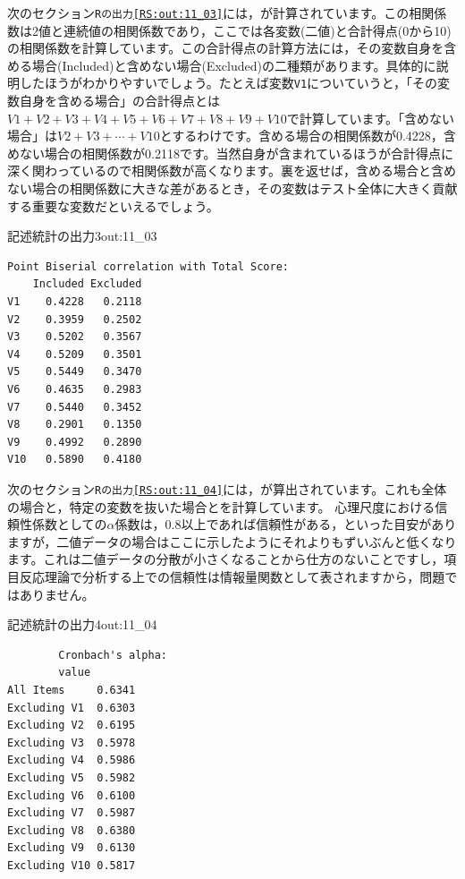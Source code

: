 \documentclass{ltjsbook}
\begin{document}
次のセクション\texttt{Rの出力\ref{RS:out:11_03}}には，が計算されています。この相関係数は2値と連続値の相関係数であり，ここでは各変数(二値)と合計得点(0から10)の相関係数を計算しています。この合計得点の計算方法には，その変数自身を含める場合(Included)と含めない場合(Excluded)の二種類があります。具体的に説明したほうがわかりやすいでしょう。たとえば変数\texttt{V1}についていうと，「その変数自身を含める場合」の合計得点とは$V1+V2+V3+V4+V5+V6+V7+V8+V9+V10$で計算しています。「含めない場合」は$V2+V3+\cdots+V10$とするわけです。含める場合の相関係数が0.4228，含めない場合の相関係数が0.2118です。当然自身が含まれているほうが合計得点に深く関わっているので相関係数が高くなります。裏を返せば，含める場合と含めない場合の相関係数に大きな差があるとき，その変数はテスト全体に大きく貢献する重要な変数だといえるでしょう。
\begin{Rscreen}{記述統計の出力3}{out:11_03}
	\begin{verbatim}
Point Biserial correlation with Total Score:
    Included Excluded
V1    0.4228   0.2118
V2    0.3959   0.2502
V3    0.5202   0.3567
V4    0.5209   0.3501
V5    0.5449   0.3470
V6    0.4635   0.2983
V7    0.5440   0.3452
V8    0.2901   0.1350
V9    0.4992   0.2890
V10   0.5890   0.4180
    \end{verbatim}
\end{Rscreen}

次のセクション\texttt{Rの出力\ref{RS:out:11_04}}には，が算出されています。これも全体の場合と，特定の変数を抜いた場合とを計算しています。
心理尺度における信頼性係数としての$\alpha$係数は，0.8以上であれば信頼性がある，といった目安がありますが，二値データの場合はここに示したようにそれよりもずいぶんと低くなります。これは二値データの分散が小さくなることから仕方のないことですし，項目反応理論で分析する上での信頼性は情報量関数として表されますから，問題ではありません。
\begin{Rscreen}{記述統計の出力4}{out:11_04}
	\begin{verbatim}
        Cronbach's alpha:
        value
All Items     0.6341
Excluding V1  0.6303
Excluding V2  0.6195
Excluding V3  0.5978
Excluding V4  0.5986
Excluding V5  0.5982
Excluding V6  0.6100
Excluding V7  0.5987
Excluding V8  0.6380
Excluding V9  0.6130
Excluding V10 0.5817
    \end{verbatim}
\end{Rscreen}
\end{document}
